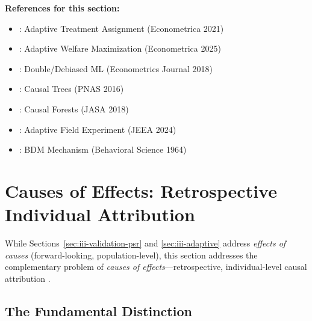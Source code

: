\textbf{References for this section:}
\begin{itemize}[nosep]
\item \citet{PAP-kasy2021adaptive}: Adaptive Treatment Assignment (Econometrica 2021)
\item \citet{PAP-kasy2025adaptive}: Adaptive Welfare Maximization (Econometrica 2025)
\item \citet{PAP-chernozhukov2018double}: Double/Debiased ML (Econometrics Journal 2018)
\item \citet{PAP-athey2016recursive}: Causal Trees (PNAS 2016)
\item \citet{PAP-wager2018causalforest}: Causal Forests (JASA 2018)
\item \citet{PAP-caria2024refugees}: Adaptive Field Experiment (JEEA 2024)
\item \citet{PAP-becker1964bdm}: BDM Mechanism (Behavioral Science 1964)
\end{itemize}



\section{Causes of Effects: Retrospective Individual Attribution}
\label{sec:iii-coe}

While Sections~\ref{sec:iii-validation-psr} and \ref{sec:iii-adaptive} address
\emph{effects of causes} (forward-looking, population-level), this section addresses
the complementary problem of \emph{causes of effects}---retrospective, individual-level
causal attribution \citep{PAP-pearl2015causes, PAP-dawid2022effects}.

\subsection{The Fundamental Distinction}


